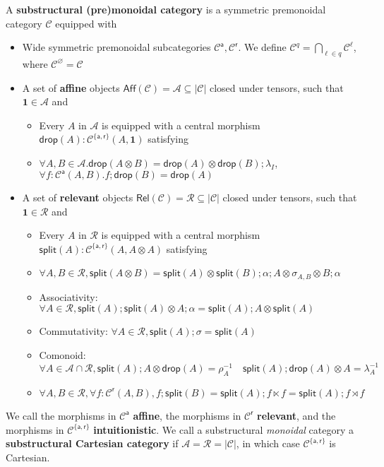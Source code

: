 \documentclass[acmsmall,screen,review]{acmart}
\newcommand{\mc}[1]{\ensuremath{\mathcal{#1}}}
\newcommand{\mb}[1]{\ensuremath{\mathbf{#1}}}
\newcommand{\ms}[1]{\ensuremath{\mathsf{#1}}}
\begin{document}
\begin{definition}
  A \textbf{substructural (pre)monoidal category} is a symmetric premonoidal
  category \(\mc{C}\) equipped with
  \begin{itemize}
    \item Wide symmetric premonoidal subcategories \(\mc{C}^{\ms{a}},
    \mc{C}^{\ms{r}}\). We define \(\mc{C}^q = \bigcap_{\ell \in q}\mc{C}^\ell\),
    where \(\mc{C}^\varnothing = \mc{C}\)
    \item A set of \textbf{affine} objects \(\ms{Aff}(\mc{C}) = \mc{A} \subseteq
    |\mc{C}|\) closed under tensors, such that \(\mb{1} \in \mc{A}\) and
    \begin{itemize}
      \item Every \(A\) in \(\mc{A}\) is equipped with a central morphism
      \(\ms{drop}(A): \mc{C}^{\{\ms{a}, \ms{r}\}}(A, \mb{1})\) satisfying
      \item \(\forall A, B \in \mc{A}. \ms{drop}(A \otimes B) = \ms{drop}(A) \otimes \ms{drop}(B);\lambda_I\), \(\forall f: \mc{C}^{\ms{a}}(A, B). f;\ms{drop}(B) = \ms{drop}(A)\)
    \end{itemize}
    \item A set of \textbf{relevant} objects \(\ms{Rel}(\mc{C}) = \mc{R}
    \subseteq |\mc{C}|\) closed under tensors, such that \(\mb{1} \in \mc{R}\)
    and
    \begin{itemize}
      \item Every \(A\) in \(\mc{R}\) is equipped with a central morphism
      \(\ms{split}(A): \mc{C}^{\{\ms{a}, \ms{r}\}}(A, A \otimes A)\) satisfying
      \item \(\forall A, B \in \mc{R}, \ms{split}(A \otimes B) = \ms{split}(A) \otimes \ms{split}(B);\alpha;A \otimes \sigma_{A, B} \otimes B;\alpha\)
      \item Associativity: \(\forall A \in \mc{R}, \ms{split}(A);\ms{split}(A) \otimes A;\alpha = \ms{split}(A);A \otimes \ms{split}(A)\)
      \item Commutativity: \(\forall A \in \mc{R}, \ms{split}(A);\sigma = \ms{split}(A)\)
      \item Comonoid: \(\forall A \in \mc{A} \cap \mc{R}, \ms{split}(A);A \otimes \ms{drop}(A) = \rho_A^{-1} \quad \ms{split}(A);\ms{drop}(A) \otimes A = \lambda_A^{-1}\)
      \item \(\forall A, B \in \mc{R}, \forall f: \mc{C}^{\ms{r}}(A, B), f;\ms{split}(B) = \ms{split}(A);f \ltimes f = \ms{split}(A);f\rtimes f\)
    \end{itemize}
  \end{itemize}
  We call the morphisms in \(\mc{C}^{\ms{a}}\) \textbf{affine}, the morphisms in
  \(\mc{C}^{\ms{r}}\) \textbf{relevant}, and the morphisms in
  \(\mc{C}^{\{\ms{a}, \ms{r}\}}\) \textbf{intuitionistic}. 
  We call a substructural \textit{monoidal} category a \textbf{substructural
  Cartesian category} if \(\mc{A} = \mc{R} = |\mc{C}|\), in which case
  \(\mc{C}^{\{\ms{a}, \ms{r}\}}\) is Cartesian.
\end{definition}
\end{document}
